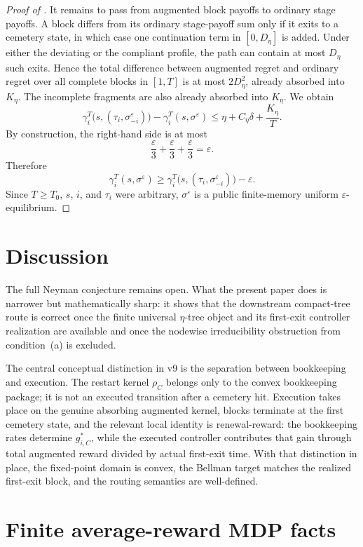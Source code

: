 \documentclass[12pt]{article}
\theoremstyle{definition}
\newcommand{\eps}{\varepsilon}
\newcommand{\1}{\mathbf{1}}
\begin{document}
\begin{proof}[Proof of ]
It remains to pass from augmented block payoffs to ordinary stage payoffs. A block
differs from its ordinary stage-payoff sum only if it exits to a cemetery state,
in which case one continuation term in $[0,D_\eta]$ is added. Under either the
deviating or the compliant profile, the path can contain at most $D_\eta$ such
exits. Hence the total difference between augmented regret and ordinary regret over
all complete blocks in $[1,T]$ is at most $2D_\eta^2$, already absorbed into
$K_\eta$. The incomplete fragments are also already absorbed into $K_\eta$. We
obtain
\[
\gamma_i^T\bigl(s,(\tau_i,\sigma^\eps_{-i})\bigr)
-
\gamma_i^T(s,\sigma^\eps)
\le
\eta + C_\eta\delta + \frac{K_\eta}{T}.
\]
By construction, the right-hand side is at most
\[
\frac{\eps}{3}+\frac{\eps}{3}+\frac{\eps}{3}=\eps.
\]
Therefore
\[
\gamma_i^T(s,\sigma^\eps)
\ge
\gamma_i^T\bigl(s,(\tau_i,\sigma^\eps_{-i})\bigr)-\eps.
\]
Since $T\ge T_0$, $s$, $i$, and $\tau_i$ were arbitrary, $\sigma^\eps$ is a
public finite-memory uniform $\eps$-equilibrium.
\end{proof}


\section{Discussion}

The full Neyman conjecture remains open. What the present paper does is narrower
but mathematically sharp: it shows that the downstream compact-tree route is
correct once the finite universal $\eta$-tree object and its first-exit controller
realization are available and once the nodewise irreducibility obstruction from
condition~\textnormal{(a)} is excluded.

The central conceptual distinction in v9 is the separation between bookkeeping and
execution. The restart kernel $\rho_C$ belongs only to the convex bookkeeping
package; it is not an executed transition after a cemetery hit. Execution takes
place on the genuine absorbing augmented kernel, blocks terminate at the first
cemetery state, and the relevant local identity is renewal-reward: the bookkeeping
rates determine $g_{i,C}^*$, while the executed controller contributes that gain
through total augmented reward divided by actual first-exit time. With that
distinction in place, the fixed-point domain is convex, the Bellman target matches
the realized first-exit block, and the routing semantics are well-defined.

\appendix

\section{Finite average-reward MDP facts}
\label{app:mdp}
\end{document}
